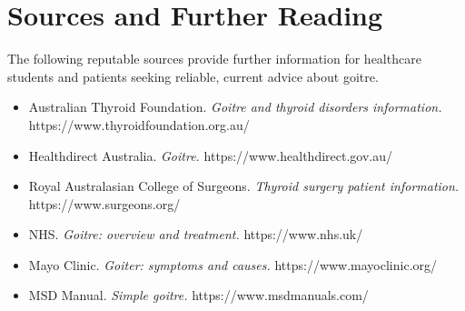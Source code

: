 \section*{Sources and Further Reading}
The following reputable sources provide further information for healthcare students and patients seeking reliable, current advice about goitre.

\begin{itemize}
    \item Australian Thyroid Foundation. \textit{Goitre and thyroid disorders information.} https://www.thyroidfoundation.org.au/
    \item Healthdirect Australia. \textit{Goitre.} https://www.healthdirect.gov.au/
    \item Royal Australasian College of Surgeons. \textit{Thyroid surgery patient information.} https://www.surgeons.org/
    \item NHS. \textit{Goitre: overview and treatment.} https://www.nhs.uk/
    \item Mayo Clinic. \textit{Goiter: symptoms and causes.} https://www.mayoclinic.org/
    \item MSD Manual. \textit{Simple goitre.} https://www.msdmanuals.com/
\end{itemize}
